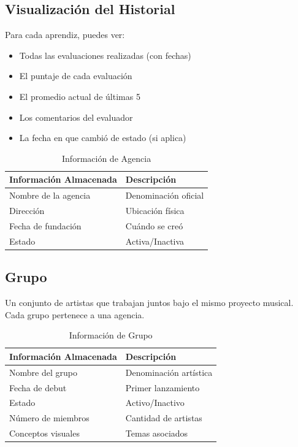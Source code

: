 \documentclass[12pt,a4paper,spanish,oneside]{report}
\begin{document}
\subsection{Visualización del Historial}

Para cada aprendiz, puedes ver:
\begin{itemize}
    \item Todas las evaluaciones realizadas (con fechas)
    \item El puntaje de cada evaluación
    \item El promedio actual de últimas 5
    \item Los comentarios del evaluador
    \item La fecha en que cambió de estado (si aplica)
\end{itemize}

\begin{table}[H]
\centering
\caption{Información de Agencia}
\begin{tabular}{|l|p{7cm}|}
\hline
\textbf{Información Almacenada} & \textbf{Descripción} \\
\hline
Nombre de la agencia & Denominación oficial \\
\hline
Dirección & Ubicación física \\
\hline
Fecha de fundación & Cuándo se creó \\
\hline
Estado & Activa/Inactiva \\
\hline
\end{tabular}
\end{table}

\subsection{Grupo}

Un conjunto de artistas que trabajan juntos bajo el mismo proyecto musical. Cada grupo pertenece a una agencia.

\begin{table}[H]
\centering
\caption{Información de Grupo}
\begin{tabular}{|l|p{7cm}|}
\hline
\textbf{Información Almacenada} & \textbf{Descripción} \\
\hline
Nombre del grupo & Denominación artística \\
\hline
Fecha de debut & Primer lanzamiento \\
\hline
Estado & Activo/Inactivo \\
\hline
Número de miembros & Cantidad de artistas \\
\hline
Conceptos visuales & Temas asociados \\
\hline
\end{tabular}
\end{table}
\end{document}
